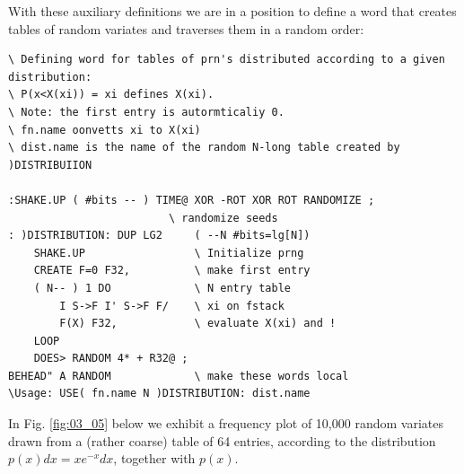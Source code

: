 With these auxiliary definitions we are in a position to define a word that creates tables of random variates and traverses them in a random order:

\begin{lstlisting}
\ Defining word for tables of prn's distributed according to a given distribution:
\ P(x<X(xi)) = xi defines X(xi).
\ Note: the first entry is autormticaliy 0.  
\ fn.name oonvetts xi to X(xi) 
\ dist.name is the name of the random N-long table created by )DISTRIBUIION

:SHAKE.UP ( #bits -- ) TIME@ XOR -ROT XOR ROT RANDOMIZE ;
                         \ randomize seeds
: )DISTRIBUTION: DUP LG2     ( --N #bits=lg[N])
    SHAKE.UP                 \ Initialize prng
    CREATE F=0 F32,          \ make first entry
    ( N-- ) 1 DO             \ N entry table
        I S->F I' S->F F/    \ xi on fstack
        F(X) F32,            \ evaluate X(xi) and !
    LOOP
    DOES> RANDOM 4* + R32@ ;
BEHEAD" A RANDOM             \ make these words local
\Usage: USE( fn.name N )DISTRIBUTION: dist.name
\end{lstlisting}

In Fig. \ref{fig:03_05} below we exhibit a frequency plot of 10,000 random variates drawn from a (rather coarse) table of 64 entries, according to the distribution $p(x)dx=xe^{-x}dx$, together with $p(x)$.

